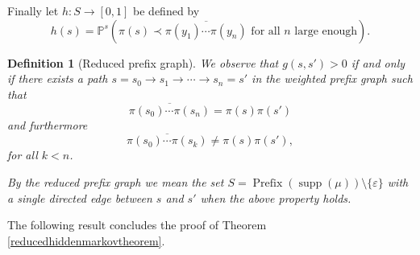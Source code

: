 \documentclass{article}
\newtheorem{definition}{Definition}
\renewcommand{\P}{\mathbb{P}}
\DeclareMathOperator{\supp}{supp}
\DeclareMathOperator{\prefix}{Prefix}
\begin{document}
Finally let \(h:S \to [0,1]\) be defined by
\[h(s) = \P^s\left(\pi(s) \prec \overline{\pi(y_1)\cdots \pi(y_n)}\text{ for all }n\text{ large enough}\right).\]

\begin{definition}[Reduced prefix graph]
We observe that \(g(s,s') > 0\) if and only if there exists a path \(s = s_0 \rightarrow s_1 \rightarrow \cdots \rightarrow s_n = s'\) in the weighted prefix graph such that 
\[\overline{\pi(s_0)\cdots \pi(s_n)} = \pi(s)\pi(s')\]
and furthermore
\[\overline{\pi(s_0)\cdots \pi(s_k)} \neq \pi(s)\pi(s'),\]
for all \(k < n\).

By the reduced prefix graph we mean the set \(S = \prefix(\supp(\mu)) \setminus \lbrace \varepsilon\rbrace\) with a single directed edge between \(s\) and \(s'\) when the above property holds. 
\end{definition}


The following result concludes the proof of Theorem \ref{reducedhiddenmarkovtheorem}.
\end{document}
